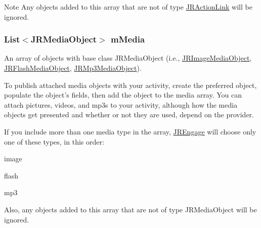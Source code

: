 \begin{DoxyNote}{Note}
Any objects added to this array that are not of type {\ttfamily \hyperlink{classcom_1_1janrain_1_1android_1_1engage_1_1types_1_1_j_r_action_link}{JRActionLink}} will be ignored. 
\end{DoxyNote}
\hypertarget{classcom_1_1janrain_1_1android_1_1engage_1_1types_1_1_j_r_activity_object_a3d89cbb011a9839da0b559556acad5f3}{
\subsubsection[{mMedia}]{\setlength{\rightskip}{0pt plus 5cm}List$<$JRMediaObject$>$ {\bf mMedia}}}
\label{classcom_1_1janrain_1_1android_1_1engage_1_1types_1_1_j_r_activity_object_a3d89cbb011a9839da0b559556acad5f3}
An array of objects with base class {\ttfamily JRMediaObject (i.e., \hyperlink{classcom_1_1janrain_1_1android_1_1engage_1_1types_1_1_j_r_image_media_object}{JRImageMediaObject}, \hyperlink{classcom_1_1janrain_1_1android_1_1engage_1_1types_1_1_j_r_flash_media_object}{JRFlashMediaObject}, \hyperlink{classcom_1_1janrain_1_1android_1_1engage_1_1types_1_1_j_r_mp3_media_object}{JRMp3MediaObject})}.

To publish attached media objects with your activity, create the preferred object, populate the object's fields, then add the object to the {\ttfamily media} array. You can attach pictures, videos, and mp3s to your activity, although how the media objects get presented and whether or not they are used, depend on the provider.

If you include more than one media type in the array, \hyperlink{classcom_1_1janrain_1_1android_1_1engage_1_1_j_r_engage}{JREngage} will choose only one of these types, in this order:
\begin{DoxyEnumerate}
\item image
\item flash
\item mp3
\end{DoxyEnumerate}

Also, any objects added to this array that are not of type {\ttfamily JRMediaObject} will be ignored.

